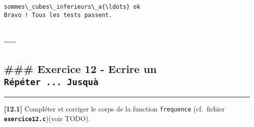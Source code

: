 \documentclass[11pt]{article}
\begin{document}
    \begin{Verbatim}[commandchars=\\\{\}]
sommes\_cubes\_inferieurs\_a{\ldots} ok
Bravo ! Tous les tests passent.
    \end{Verbatim}

    \hypertarget{section}{%
\subsection{---}\label{section}}

\hypertarget{exercice-12---ecrire-un-ruxe9puxe9ter-...-jusquuxe0}{%
\subsection{\texorpdfstring{\#\#\# Exercice 12 - Ecrire un
\texttt{Répéter\ ...\ Jusqu\textquotesingle{}à}}{\#\#\# Exercice 12 - Ecrire un Répéter ... Jusqu'à}}\label{exercice-12---ecrire-un-ruxe9puxe9ter-...-jusquuxe0}}

\begin{center}\rule{0.5\linewidth}{0.5pt}\end{center}

\textbf{{[}12.1{]}} Compléter et corriger le corps de la function
\texttt{frequence} (cf.~fichier \textbf{\texttt{exercice12.c}})(voir
TODO).
\end{document}
